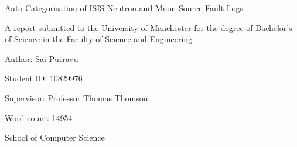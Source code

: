 \documentclass[10pt,oneside]{report}
\renewcommand{\large}{\fontsize{10}{12}\selectfont}
\begin{document}
\begin{titlepage}
    \centering
    {\fontsize{12}{14.6}\selectfont Auto-Categorisation of ISIS Neutron and Muon Source Fault Logs\\\par}
    \vspace{2cm}
    {\large A report submitted to the University of Manchester for the degree of
    Bachelor's of Science in the Faculty of Science and Engineering\par}
    \vspace{2cm}
    \vspace{1cm}

    {\large Author: Sai Putravu\par}
    {\large Student ID: 10829976\par}
    {\large Supervisor: Professor Thomas Thomson\par}
    {\large Word count: 14954\par}
    \vfill
    {\large 2025\par}
    \vspace{1cm}
    {\large School of Computer Science\par}
\end{titlepage}

\end{document}
